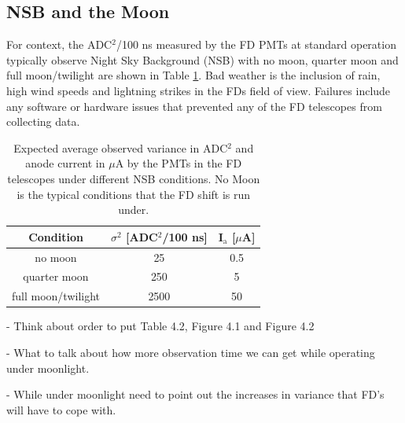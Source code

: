 \subsection{NSB and the Moon}
For context, the ADC$^2$/100 ns measured by the FD PMTs at standard operation typically observe Night Sky Background (NSB) with no moon, quarter moon and full moon/twilight are shown in Table \ref{tab:MoonLightADC}. Bad weather is the inclusion of rain, high wind speeds and lightning strikes in the FDs field of view. Failures include any software or hardware issues that prevented any of the FD telescopes from collecting data.
\begin{table}[h]
\centering
\begin{tabular}{c c c}
\hline\hline
Condition & $\sigma^2$ [ADC$^2$/100 ns] & I$_{\mathrm{a}}$ [$\mu$A] \\ \hline\hline
no moon & 25 & 0.5 \\
quarter moon & 250 & 5 \\
full moon/twilight & 2500 & 50 \\ 
\hline\hline
\end{tabular}
\caption{Expected average observed variance in ADC$^2$ and anode current in $\mu$A by the PMTs in the FD telescopes under different NSB conditions. No Moon is the typical conditions that the FD shift is run under.  } \label{tab:MoonLightADC}
\end{table}

- Think about order to put Table 4.2, Figure 4.1 and Figure 4.2

- What to talk about how more observation time we can get while operating under moonlight.

- While under moonlight need to point out the increases in variance that FD's will have to cope with.


